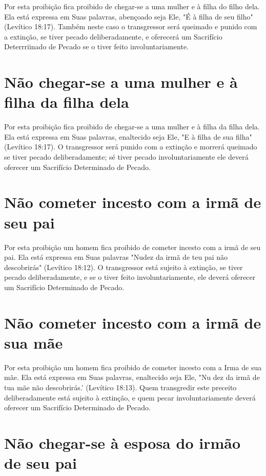 \begin{itemize}
\begin{enumrate}
\begin{itemize}
\begin{itemize}
\begin{itemize}
Por esta proibição fica proibido de chegar-se a uma mulher e à filha do
filho dela. Ela está expressa em Suas palavras, abençoado seja Ele, "É à
filha de seu filho" (Levítico 18:17). Também neste caso o transgressor
será queima­do e punido com a extinção, se tiver pecado deliberadamente,
e oferecerá um Sacrifício Deterrriinado de Pecado se o tiver feito
involuntariamente.

\section{Não chegar-se a uma mulher e à filha da filha dela}

Por esta proibição fica proibido de chegar-se a uma mulher e à filha da
filha dela. Ela está expressa em Suas palavras, enaltecido seja Ele, "E
à filha de sua filha" (Levítico 18:17). O transgressor será punido com a
extinção e mor­rerá queimado se tiver pecado deliberadamente; sé tiver
pecado involuntaria­mente ele deverá oferecer um Sacrifício Determinado
de Pecado.

\section{Não cometer incesto com a irmã de seu pai}

Por esta proibição um homem fica proibido de cometer incesto com a irmã
de seu pai. Ela está expressa em Suas palavras "Nudez da irmã de teu pai
não descobrirás" (Levítico 18:12). O transgressor está sujeito à
extinção, se tiver pecado deliberadamente, e se o tiver feito
involuntariamente, ele deve­rá oferecer um Sacrifício Determinado de
Pecado.

\section{Não cometer incesto com a irmã de sua mãe}

Por esta proibição um homem fica proibido de cometer incesto com a Irma
de sua mãe. Ela está expressa em Suas palavras, enaltecido seja Ele, "Nu
dez da irmã de tua mãe não descobrirás.' (Levítico
18:13). Quem transgredir este preceito deliberadamente está sujeito à
extinção, e quem pecar involunta­riamente deverá oferecer um Sacrifício
Determinado de Pecado.

\section{Não chegar-se à esposa do irmão de seu pai}


\end{itemize}
\end{itemize}
\end{itemize}
\end{enumrate}
\end{itemize}
